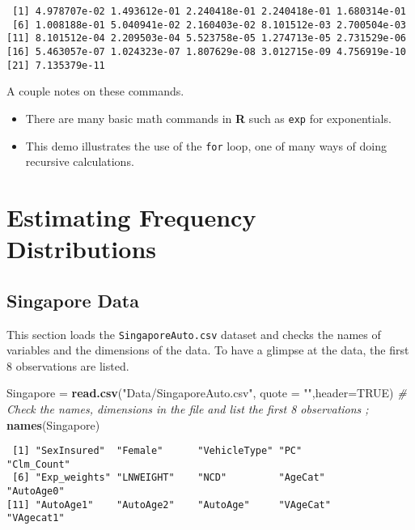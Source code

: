 \documentclass[]{book}
\newenvironment{Shaded}{\begin{snugshade}}{\end{snugshade}}
\newcommand{\KeywordTok}[1]{\textcolor[rgb]{0.13,0.29,0.53}{\textbf{#1}}}
\newcommand{\DataTypeTok}[1]{\textcolor[rgb]{0.13,0.29,0.53}{#1}}
\newcommand{\StringTok}[1]{\textcolor[rgb]{0.31,0.60,0.02}{#1}}
\newcommand{\CommentTok}[1]{\textcolor[rgb]{0.56,0.35,0.01}{\textit{#1}}}
\newcommand{\OtherTok}[1]{\textcolor[rgb]{0.56,0.35,0.01}{#1}}
\newcommand{\NormalTok}[1]{#1}
\providecommand{\tightlist}{%
  \setlength{\itemsep}{0pt}\setlength{\parskip}{0pt}}
\theoremstyle{definition}
\theoremstyle{definition}
\theoremstyle{definition}
\theoremstyle{remark}
\begin{document}
\begin{verbatim}
 [1] 4.978707e-02 1.493612e-01 2.240418e-01 2.240418e-01 1.680314e-01
 [6] 1.008188e-01 5.040941e-02 2.160403e-02 8.101512e-03 2.700504e-03
[11] 8.101512e-04 2.209503e-04 5.523758e-05 1.274713e-05 2.731529e-06
[16] 5.463057e-07 1.024323e-07 1.807629e-08 3.012715e-09 4.756919e-10
[21] 7.135379e-11
\end{verbatim}

A couple notes on these commands.

\begin{itemize}
\tightlist
\item
  There are many basic math commands in \textbf{R} such as \texttt{exp}
  for exponentials.
\item
  This demo illustrates the use of the \texttt{for} loop, one of many
  ways of doing recursive calculations.
\end{itemize}

\section{Estimating Frequency
Distributions}\label{estimating-frequency-distributions}

\subsection{Singapore Data}\label{singapore-data}

This section loads the \texttt{SingaporeAuto.csv} dataset and checks the
names of variables and the dimensions of the data. To have a glimpse at
the data, the first 8 observations are listed.

\begin{Shaded}
\begin{Highlighting}[]
\NormalTok{Singapore =}\StringTok{ }\KeywordTok{read.csv}\NormalTok{(}\StringTok{"Data/SingaporeAuto.csv"}\NormalTok{,  }\DataTypeTok{quote =} \StringTok{""}\NormalTok{,}\DataTypeTok{header=}\OtherTok{TRUE}\NormalTok{)}
\CommentTok{#  Check the names, dimensions in the file and list the first 8 observations ;}
\KeywordTok{names}\NormalTok{(Singapore)}
\end{Highlighting}
\end{Shaded}

\begin{verbatim}
 [1] "SexInsured"  "Female"      "VehicleType" "PC"          "Clm_Count"  
 [6] "Exp_weights" "LNWEIGHT"    "NCD"         "AgeCat"      "AutoAge0"   
[11] "AutoAge1"    "AutoAge2"    "AutoAge"     "VAgeCat"     "VAgecat1"   
\end{verbatim}
\end{document}

